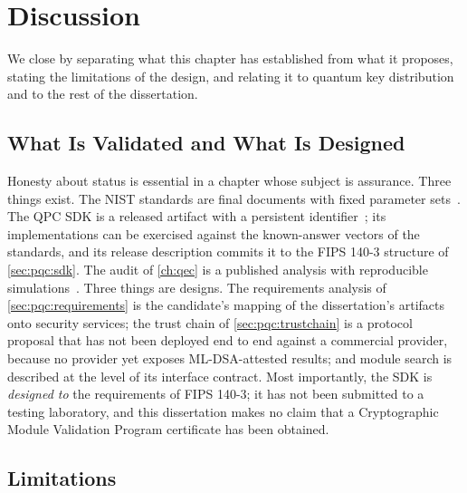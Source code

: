 \section{Discussion}\label{sec:pqc:discussion}

We close by separating what this chapter has established from what it proposes, stating the limitations of the design, and relating it to quantum key distribution and to the rest of the dissertation.

\subsection{What Is Validated and What Is Designed}\label{sec:pqc:validated}

Honesty about status is essential in a chapter whose subject is assurance. Three things exist. The NIST standards are final documents with fixed parameter sets~\cite{nist2024fips203,nist2024fips204,nist2024fips205}. The QPC SDK is a released artifact with a persistent identifier~\cite{guo2026lightriderqpc}; its implementations can be exercised against the known-answer vectors of the standards, and its release description commits it to the FIPS 140-3 structure of \cref{sec:pqc:sdk}. The audit of \cref{ch:qec} is a published analysis with reproducible simulations~\cite{guo2026qecaudit}. Three things are designs. The requirements analysis of \cref{sec:pqc:requirements} is the candidate's mapping of the dissertation's artifacts onto security services; the trust chain of \cref{sec:pqc:trustchain} is a protocol proposal that has not been deployed end to end against a commercial provider, because no provider yet exposes ML-DSA-attested results; and module search is described at the level of its interface contract. Most importantly, the SDK is \emph{designed to} the requirements of FIPS 140-3; it has not been submitted to a testing laboratory, and this dissertation makes no claim that a Cryptographic Module Validation Program certificate has been obtained.

\subsection{Limitations}\label{sec:pqc:limitations}

